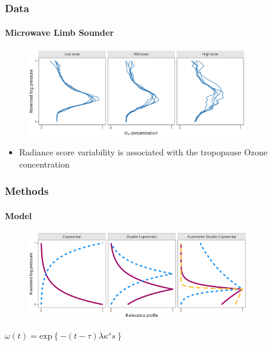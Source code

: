 \documentclass{snedecorbeamer}
\begin{document}
\begin{frame}[c]
  \frametitle{Data}
  \framesubtitle{Microwave Limb Sounder}

  \begin{figure}
    \centering
    \includegraphics[height=10em]{inc/mls_input_profiles}
  \end{figure}

  \begin{itemize}
  \item Radiance score variability is associated with the tropopause Ozone
    concentration
  \end{itemize}

\end{frame}

\begin{frame}[c]
  \frametitle{Methods}
  \framesubtitle{Model}

  \begin{figure}
    \centering
    \includegraphics[height=10em]{inc/mls_weight_profiles}
  \end{figure}

  \begin{center}
    $\omega(t) = \text{exp}\left\{-(t - \tau) \lambda \kappa^s s\right\}$\\
  \end{center}

  \blankfootnote{
    Space:
    $\omega(t): \mathcal{T} = [0, 1] \to (0, 1]$,
    $s = \text{sign}(t - \tau)$,
    $\tau > 0$,
    $\lambda > 0$,
    $\kappa > 0$ \\
    \hspace{3.25ex}
    Priors:
    $\indent\tau \sim \textsc{Beta}$,
    $\lambda \sim \textsc{N}^{+}$,
    $\log(\kappa) \sim \textsc{N}$
  }
\end{frame}
\end{document}
